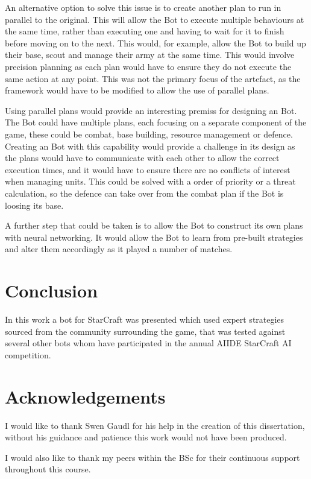 \documentclass[journal]{IEEEtran}
\begin{document}
An alternative option to solve this issue is to create another plan to run in parallel to the original. This will allow the Bot to execute multiple behaviours at the same time, rather than executing one and having to wait for it to finish before moving on to the next. This would, for example, allow the Bot to build up their base, scout and manage their army at the same time. This would involve precision planning as each plan would have to ensure they do not execute the same action at any point. This was not the primary focus of the artefact, as the framework would have to be modified to allow the use of parallel plans.

Using parallel plans would provide an interesting premiss for designing an Bot. The Bot could have multiple plans, each focusing on a separate component of the game, these could be combat, base building, resource management or defence. Creating an Bot with this capability would provide a challenge in its design as the plans would have to communicate with each other to allow the correct execution times, and it would have to ensure there are no conflicts of interest when managing units. This could be solved with a order of priority or a threat calculation, so the defence can take over from the combat plan if the Bot is loosing its base.

A further step that could be taken is to allow the Bot to construct its own plans with neural networking. It would allow the Bot to learn from pre-built strategies and alter them accordingly as it played a number of matches.

\section{Conclusion}

In this work a bot for StarCraft was presented which used expert strategies sourced from the community surrounding the game, that was tested against several other bots whom have participated in the annual AIIDE StarCraft AI competition.

\section{Acknowledgements}
I would like to thank Swen Gaudl for his help in the creation of this dissertation, without his guidance and patience this work would not have been produced.

I would also like to thank my peers within the BSc for their continuous support throughout this course.
\end{document}
